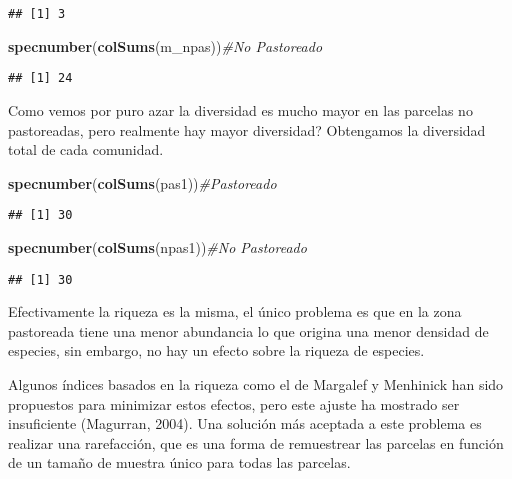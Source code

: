 \documentclass[]{book}
\newenvironment{Shaded}{\begin{snugshade}}{\end{snugshade}}
\newcommand{\KeywordTok}[1]{\textcolor[rgb]{0.13,0.29,0.53}{\textbf{{#1}}}}
\newcommand{\CommentTok}[1]{\textcolor[rgb]{0.56,0.35,0.01}{\textit{{#1}}}}
\newcommand{\NormalTok}[1]{{#1}}
\begin{document}
\begin{verbatim}
## [1] 3
\end{verbatim}

\begin{Shaded}
\begin{Highlighting}[]
\KeywordTok{specnumber}\NormalTok{(}\KeywordTok{colSums}\NormalTok{(m_npas))}\CommentTok{#No Pastoreado}
\end{Highlighting}
\end{Shaded}

\begin{verbatim}
## [1] 24
\end{verbatim}

Como vemos por puro azar la diversidad es mucho mayor en las parcelas no
pastoreadas, pero realmente hay mayor diversidad? Obtengamos la
diversidad total de cada comunidad.

\begin{Shaded}
\begin{Highlighting}[]
\KeywordTok{specnumber}\NormalTok{(}\KeywordTok{colSums}\NormalTok{(pas1))}\CommentTok{#Pastoreado}
\end{Highlighting}
\end{Shaded}

\begin{verbatim}
## [1] 30
\end{verbatim}

\begin{Shaded}
\begin{Highlighting}[]
\KeywordTok{specnumber}\NormalTok{(}\KeywordTok{colSums}\NormalTok{(npas1))}\CommentTok{#No Pastoreado}
\end{Highlighting}
\end{Shaded}

\begin{verbatim}
## [1] 30
\end{verbatim}

Efectivamente la riqueza es la misma, el único problema es que en la
zona pastoreada tiene una menor abundancia lo que origina una menor
densidad de especies, sin embargo, no hay un efecto sobre la riqueza de
especies.

Algunos índices basados en la riqueza como el de Margalef y Menhinick
han sido propuestos para minimizar estos efectos, pero este ajuste ha
mostrado ser insuficiente (Magurran, 2004). Una solución más aceptada a
este problema es realizar una rarefacción, que es una forma de
remuestrear las parcelas en función de un tamaño de muestra único para
todas las parcelas.
\end{document}
